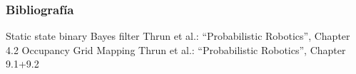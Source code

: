 \begin{frame}
	\frametitle{Bibliografía}
   
    Static state binary Bayes filter
    Thrun et al.: “Probabilistic Robotics”,
    Chapter 4.2
    Occupancy Grid Mapping
    Thrun et al.: “Probabilistic Robotics”,
    Chapter 9.1+9.2
	
	\printbibliography
	
\end{frame}